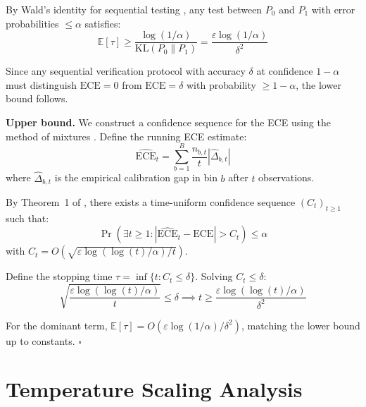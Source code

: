 \documentclass{article}
\newcommand{\ECE}{\mathrm{ECE}}
\newcommand{\errrate}{\varepsilon}
\newcommand{\calmap}{\Delta}
\providecommand{\E}{}
\renewcommand{\E}{\mathbb{E}}
\providecommand{\KL}{}
\renewcommand{\KL}{\mathrm{KL}}
\newcommand{\stoppingtime}{\tau}
\newcommand{\targetacc}{\delta}
\newcommand{\confalpha}{\alpha}
\theoremstyle{definition}
\begin{document}
By Wald's identity for sequential testing \citep{tsybakov2009nonparametric}, any test between $P_0$ and $P_1$ with error probabilities $\leq \confalpha$ satisfies:
\begin{equation}
\E[\stoppingtime] \geq \frac{\log(1/\confalpha)}{\KL(P_0 \| P_1)} = \frac{\errrate \log(1/\confalpha)}{\targetacc^2}
\end{equation}

Since any sequential verification protocol with accuracy $\targetacc$ at confidence $1 - \confalpha$ must distinguish $\ECE = 0$ from $\ECE = \targetacc$ with probability $\geq 1 - \confalpha$, the lower bound follows.

\textbf{Upper bound.} We construct a confidence sequence for the ECE using the method of mixtures \citep{howard2021timeuniform}. Define the running ECE estimate:
\begin{equation}
\widehat{\ECE}_t = \sum_{b=1}^{B} \frac{n_{b,t}}{t} \left| \hat{\calmap}_{b,t} \right|
\end{equation}
where $\hat{\calmap}_{b,t}$ is the empirical calibration gap in bin $b$ after $t$ observations.

By Theorem~1 of \citet{howard2021timeuniform}, there exists a time-uniform confidence sequence $(C_t)_{t \geq 1}$ such that:
\begin{equation}
\Pr\left(\exists t \geq 1: |\widehat{\ECE}_t - \ECE| > C_t\right) \leq \confalpha
\end{equation}
with $C_t = O(\sqrt{\errrate \log(\log(t)/\confalpha) / t})$.

Define the stopping time $\stoppingtime = \inf\{t : C_t \leq \targetacc\}$. Solving $C_t \leq \targetacc$:
\begin{equation}
\sqrt{\frac{\errrate \log(\log(t)/\confalpha)}{t}} \leq \targetacc \implies t \geq \frac{\errrate \log(\log(t)/\confalpha)}{\targetacc^2}
\end{equation}

For the dominant term, $\E[\stoppingtime] = O(\errrate \log(1/\confalpha) / \targetacc^2)$, matching the lower bound up to constants. $\square$

\section{Temperature Scaling Analysis}
\label{app:tempscaling}
\end{document}
